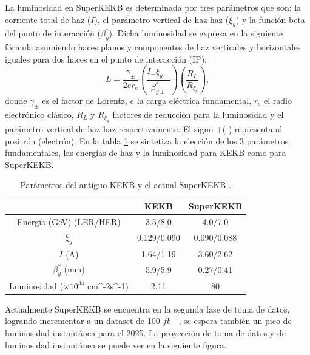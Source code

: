 La luminosidad en SuperKEKB es determinada por tres parámetros que son: la corriente total de haz (\(I\)), el parámetro vertical de haz-haz (\(\xi_y\)) y la función beta del punto de interacción (\(\beta^{*}_{y}\)).   Dicha luminosidad se expresa en la siguiente fórmula asumiendo haces planos y componentes de haz verticales y horizontales iguales para dos haces en el punto de interacción (IP):
\begin{equation}
    L=\frac{\gamma_{\pm}}{2er_{e}}\left(\frac{I_{\pm}\xi_{y\pm}}{\beta^{*}_{y\pm}}\right)\left(\frac{R_{L}}{R_{\xi_{y}}}\right),
\end{equation}
donde \(\gamma_{\pm}\) es el factor de Lorentz, \(e\) la carga eléctrica fundamental, \(r_{e}\) el radio electrónico clásico, \(R_{L}\) y \(R_{\xi_{y}}\) factores de reducción para la luminosidad y el parámetro vertical de haz-haz respectivamente. El signo +(-) representa al positrón (electrón). En la tabla \ref{table:1} se sintetiza la elección de los 3 parámetros fundamentales, las energías de haz y la luminosidad para KEKB como para SuperKEKB.

\begin{table}[h!]
\centering
\begin{tabular}{|| c c c||} 
 \hline
  & KEKB & SuperKEKB \\ [0.5ex] 
 \hline\hline
 Energía (GeV) (LER/HER) & 3.5/8.0 & 4.0/7.0 \\ 
 \(\xi_{y}\) & 0.129/0.090 & 0.090/0.088  \\
 \(I\) (A) & 1.64/1.19 & 3.60/2.62   \\
 \(\beta^{*}_{y}\) (mm) & 5.9/5.9 & 0.27/0.41  \\
 Luminosidad (\(\times 10^{34}\) cm^{-2}s^{-1}) & 2.11 & 80  \\ [1ex] 
 \hline
\end{tabular}
\caption{Parámetros del antiguo KEKB y el actual SuperKEKB \cite{abe2010belle}.}
\label{table:1}
\end{table}

Actualmente SuperKEKB se encuentra en la segunda fase de toma de datos, logrando incrementar a un dataset de 100 \(fb^{-1}\), se espera también un pico de luminosidad instantánea para el 2025. La proyección de toma de datos y de luminosidad instantánea se puede ver en la siguiente figura.

